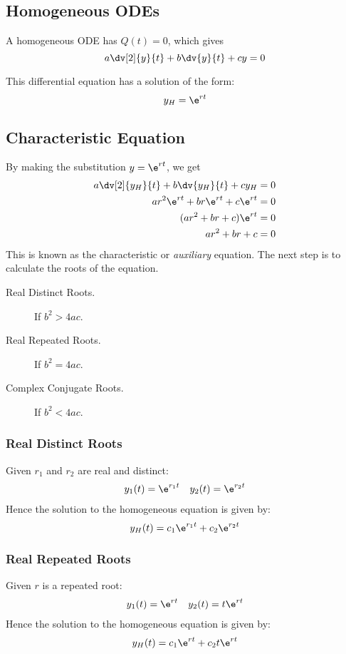 \documentclass{article}
\begin{document}
\subsection{Homogeneous ODEs}
\begin{definition}
    A homogeneous ODE has $Q(t)=0$, which gives
    \begin{equation*}
        a \dv[2]{y}{t} + b \dv{y}{t} + c y = 0
    \end{equation*}
\end{definition}
This differential equation has a solution of the form:
\begin{equation*}
    y_H = \e^{rt}
\end{equation*}
\subsection{Characteristic Equation}
By making the substitution $y=\e^{rt}$, we get
\begin{align*}
    a \dv[2]{y_H}{t} + b \dv{y_H}{t} + c y_H & = 0 \\
    ar^2\e^{rt} + br\e^{rt} + c\e^{rt}       & = 0 \\
    (ar^2 + br + c)\e^{rt}                   & = 0 \\
    ar^2 + br + c                            & = 0
\end{align*}
This is known as the characteristic or \textit{auxiliary} equation. The next step is to calculate the roots of the equation.
\begin{description}
    \item[Real Distinct Roots.] If $b^2 > 4ac$.
    \item[Real Repeated Roots.] If $b^2 = 4ac$.
    \item[Complex Conjugate Roots.] If $b^2 < 4ac$.
\end{description}
\subsubsection{Real Distinct Roots}
Given $r_1$ and $r_2$ are real and distinct:
\begin{align*}
    y_1(t) = \e^{r_1t} &  & y_2(t) = \e^{r_2t}
\end{align*}
Hence the solution to the homogeneous equation is given by:
\begin{equation*}
    y_H(t) = c_1\e^{r_1t} + c_2\e^{r_2t}
\end{equation*}
\subsubsection{Real Repeated Roots}
Given $r$ is a repeated root:
\begin{align*}
    y_1(t) = \e^{rt} &  & y_2(t) = t\e^{rt}
\end{align*}
Hence the solution to the homogeneous equation is given by:
\begin{equation*}
    y_H(t) = c_1\e^{rt} + c_2t\e^{rt}
\end{equation*}
\end{document}
